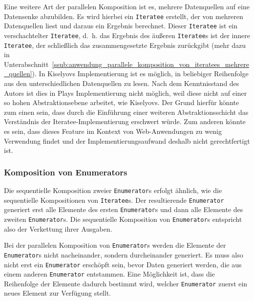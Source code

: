 Eine weitere Art der parallelen Komposition ist es, mehrere Datenquellen auf eine Datensenke abzubilden.
Es wird hierbei ein \lstinline|Iteratee| erstellt, der von mehreren Datenquellen liest und daraus ein Ergebnis berechnet.
Dieser \lstinline|Iteratee| ist ein verschachtelter \lstinline|Iteratee|, d.~h. das Ergebnis des äußeren \lstinline|Iteratee|s ist der innere \lstinline|Iteratee|, der schließlich das zusammengesetzte Ergebnis zurückgibt (mehr dazu in Unterabschnitt~\ref{ssub:anwendung_parallele_komposition_von_iteratees_mehrere_quellen}).
In Kiselyovs Implementierung ist es möglich, in beliebiger Reihenfolge aus den unterschiedlichen Datenquellen zu lesen.
Nach dem Kenntnisstand des Autors ist dies in Plays Implementierung nicht möglich, weil diese nicht auf einer so hohen Abstraktionsebene arbeitet, wie Kiselyovs.
Der Grund hierfür könnte zum einen sein, dass durch die Einführung einer weiteren Abstraktionsschicht das Verständnis der Iteratee-Implementierung erschwert würde.
Zum anderen könnte es sein, dass dieses Feature im Kontext von Web-Anwendungen zu wenig Verwendung findet und der Implementierungsaufwand deshalb nicht gerechtfertigt ist.


\subsubsection{Komposition von Enumerators} %
\label{ssub:komposition_von_enumerators}

Die sequentielle Komposition zweier \lstinline|Enumerator|s erfolgt ähnlich, wie die sequentielle Kompositionen von \lstinline|Iteratee|s.
Der resultierende \lstinline|Enumerator| generiert erst alle Elemente des ersten \lstinline|Enumerator|s und dann alle Elemente des zweiten \lstinline|Enumerator|s.
Die sequentielle Komposition von \lstinline|Enumerator|s entspricht also der Verkettung ihrer Ausgaben. %

Bei der parallelen Komposition von \lstinline|Enumerator|s werden die Elemente der \lstinline|Enumerator|s nicht nacheinander, sondern durcheinander generiert.
Es muss also nicht erst ein \lstinline|Enumerator| erschöpft sein, bevor Daten generiert werden, die aus einem anderen \lstinline|Enumerator| entstammen.
Eine Möglichkeit ist, dass die Reihenfolge der Elemente dadurch bestimmt wird, welcher \lstinline|Enumerator| zuerst ein neues Element zur Verfügung stellt. %


